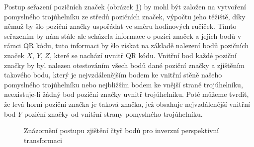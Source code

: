 Postup seřazení pozičních značek (obrázek \ref{QRCodeArea}) by mohl být založen
na vytvoření pomyslného trojúhelníku ze středů pozičních značek, výpočtu jeho těžiště, díky
němuž by šlo poziční značky uspořádat ve směru hodinových ručiček. Tímto
seřazením by nám stále ale scházela informace o pozici značek a jejich bodů 
v rámci QR kódu, tuto informaci by šlo získat na základě nalezení bodů
pozičních značek $X$, $Y$, $Z$, které se nachází uvnitř QR kódu. Vnitřní bod
každé poziční značky by byl nalezen otestováním všech bodů dané poziční značky a
zjištěním takového bodu, který je nejvzdálenějším bodem ke vnitřní stěně našeho
pomyslného trojúhelníku nebo nejbližším bodem ke vnější straně trojúhelníku,
neexistuje-li žádný bod poziční značky uvnitř trojúhelníku. Poté můžeme tvrdit,
že levá horní poziční značka je taková značka, jež obsahuje nejvzdálenější
vnitřní bod $Y$ poziční značky od vnitřní strany pomyslného trojúhelníku.

\begin{figure}[H]
  \begin{center}
    \caption{Znázornění postupu zjištění čtyř bodů pro inverzní perspektivní
    transformaci}
    \label{QRCodeArea}
  \end{center}
\end{figure}

